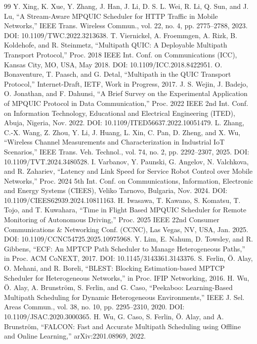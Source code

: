 \documentclass[preprint,11pt]{elsarticle}
\begin{document}
\begin{thebibliography}{99}
 Y. Xing, K. Xue, Y. Zhang, J. Han, J. Li, D. S. L. Wei, R. Li, Q. Sun, and J. Lu, ``A Stream-Aware MPQUIC Scheduler for HTTP Traffic in Mobile Networks,'' IEEE Trans. Wireless Commun., vol. 22, no. 4, pp. 2775--2788, 2023. DOI: 10.1109/TWC.2022.3213638.
 T. Viernickel, A. Froemmgen, A. Rizk, B. Koldehofe, and R. Steinmetz, ``Multipath QUIC: A Deployable Multipath Transport Protocol,'' Proc. 2018 IEEE Int. Conf. on Communications (ICC), Kansas City, MO, USA, May 2018. DOI: 10.1109/ICC.2018.8422951.
 O. Bonaventure, T. Paasch, and G. Detal, ``Multipath in the QUIC Transport Protocol,'' Internet-Draft, IETF, Work in Progress, 2017.
 J. S. Wejin, J. Badejo, O. Jonathan, and F. Dahunsi, ``A Brief Survey on the Experimental Application of MPQUIC Protocol in Data Communication,'' Proc. 2022 IEEE 2nd Int. Conf. on Information Technology, Educational and Electrical Engineering (ITED), Abuja, Nigeria, Nov. 2022. DOI: 10.1109/ITED56637.2022.10051479.
 L. Zhang, C.-X. Wang, Z. Zhou, Y. Li, J. Huang, L. Xin, C. Pan, D. Zheng, and X. Wu, ``Wireless Channel Measurements and Characterization in Industrial IoT Scenarios,'' IEEE Trans. Veh. Technol., vol. 74, no. 2, pp. 2292--2307, 2025. DOI: 10.1109/TVT.2024.3480528.
 I. Varbanov, Y. Paunski, G. Angelov, N. Valchkova, and R. Zahariev, ``Latency and Link Speed for Service Robot Control over Mobile Networks,'' Proc. 2024 5th Int. Conf. on Communications, Information, Electronic and Energy Systems (CIEES), Veliko Tarnovo, Bulgaria, Nov. 2024. DOI: 10.1109/CIEES62939.2024.10811163.
 H. Iwasawa, T. Kawano, S. Komatsu, T. Tojo, and T. Kuwahara, ``Time in Flight Based MPQUIC Scheduler for Remote Monitoring of Autonomous Driving,'' Proc. 2025 IEEE 22nd Consumer Communications \& Networking Conf. (CCNC), Las Vegas, NV, USA, Jan. 2025. DOI: 10.1109/CCNC54725.2025.10975968.
 Y. Lim, E. Nahum, D. Towsley, and R. Gibbens, ``ECF: An MPTCP Path Scheduler to Manage Heterogeneous Paths,'' in Proc. ACM CoNEXT, 2017. DOI: 10.1145/3143361.3143376.
 S. Ferlin, \"O. Alay, O. Mehani, and R. Boreli, ``BLEST: Blocking Estimation-based MPTCP Scheduler for Heterogeneous Networks,'' in Proc. IFIP Networking, 2016.
 H. Wu, \"O. Alay, A. Brunstr\"om, S. Ferlin, and G. Caso, ``Peekaboo: Learning-Based Multipath Scheduling for Dynamic Heterogeneous Environments,'' IEEE J. Sel. Areas Commun., vol. 38, no. 10, pp. 2295--2310, 2020. DOI: 10.1109/JSAC.2020.3000365.
 H. Wu, G. Caso, S. Ferlin, \"O. Alay, and A. Brunstr\"om, ``FALCON: Fast and Accurate Multipath Scheduling using Offline and Online Learning,'' arXiv:2201.08969, 2022.

\end{thebibliography}
\end{document}

